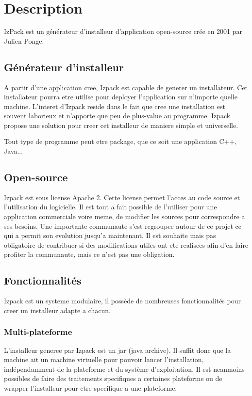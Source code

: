 \section{Description}
IzPack est un générateur d'installeur d'application open-source crée en 2001 par Julien Ponge.
\subsection{Générateur d'installeur}
A partir d'une application cree, Izpack est capable de generer un installateur. Cet installateur pourra etre utilise pour deployer l'application sur n'importe quelle machine. L'interet d'Izpack reside dans le fait que cree une installation est souvent laborieux et n'apporte que peu de plus-value au programme. Izpack propose une solution pour creer cet installeur de maniere simple et universelle. 

Tout type de programme peut etre package, que ce soit une application C++, Java...
\subsection{Open-source}
Izpack est sous license Apache 2. Cette license permet l'acces au code source et l'utilisation du logicielle. Il est tout a fait possible de l'utiliser pour une application commerciale voire meme, de modifier les sources pour correspondre a ses besoins. Une importante communaute s'est regroupee autour de ce projet ce qui a permit son evolution jusqu'a maintenant. Il est souhaite mais pas obligatoire de contribuer si des modifications utiles ont ete realisees afin d'en faire profiter la communaute, mais ce n'est pas une obligation. 

\subsection{Fonctionnalités}
Izpack est un systeme modulaire, il possède de nombreuses fonctionnalités pour creer un installeur adapte a chacun.
\subsubsection{Multi-plateforme}
L'installeur generee par Izpack est un jar (java archive). Il suffit donc que la machine ait un machine virtuelle pour pouvoir lancer l'installation, indépendamment de la plateforme et du système d'exploitation. Il est neanmoins possibles de faire des traitements specifiques a certaines plateforme ou de wrapper l'installeur pour etre specifique a une plateforme. 
